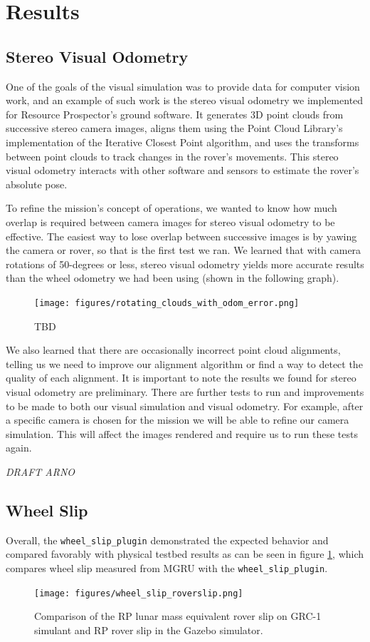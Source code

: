 \documentclass[twocolumn,letterpaper]{IEEEAerospaceCLS}  %
\begin{document}
\section{Results}

\subsection{Stereo Visual Odometry}
One of the goals of the visual simulation was to provide data for computer vision work, and an example of such work is the stereo visual odometry we implemented for Resource Prospector's ground software. It generates 3D point clouds from successive stereo camera images, aligns them using the Point Cloud Library's implementation of the Iterative Closest Point algorithm, and uses the transforms between point clouds to track changes in the rover's movements. This stereo visual odometry interacts with other software and sensors to estimate the rover's absolute pose.

To refine the mission's concept of operations, we wanted to know how much overlap is required between camera images for stereo visual odometry to be effective. The easiest way to lose overlap between successive images is by yawing the camera or rover, so that is the first test we ran. We learned that with camera rotations of 50-degrees or less, stereo visual odometry yields more accurate results than the wheel odometry we had been using (shown in the following graph).
\begin{figure}[h!]
	\texttt{[image: figures/rotating\_clouds\_with\_odom\_error.png]}
    \caption{TBD}
\end{figure}

We also learned that there are occasionally incorrect point cloud alignments, telling us we need to improve our alignment algorithm or find a way to detect the quality of each alignment. It is important to note the results we found for stereo visual odometry are preliminary. There are further tests to run and improvements to be made to both our visual simulation and visual odometry. For example, after a specific camera is chosen for the mission we will be able to refine our camera simulation. This will affect the images rendered and require us to run these tests again.

\textit{DRAFT ARNO}
\subsection{Wheel Slip}
Overall, the \texttt{wheel\_slip\_plugin} demonstrated the expected behavior and compared favorably with physical testbed results as can be seen in figure \ref{fig:wheelsliptuningchart}, which compares wheel slip measured from MGRU with the  \texttt{wheel\_slip\_plugin}. 
\begin{figure}[h!]
	\texttt{[image: figures/wheel\_slip\_roverslip.png]}
   	\caption{Comparison of the RP lunar mass equivalent rover slip on GRC-1 simulant and RP rover slip in the Gazebo simulator.}
    \label{fig:wheelsliptuningchart}
\end{figure}
\end{document}
